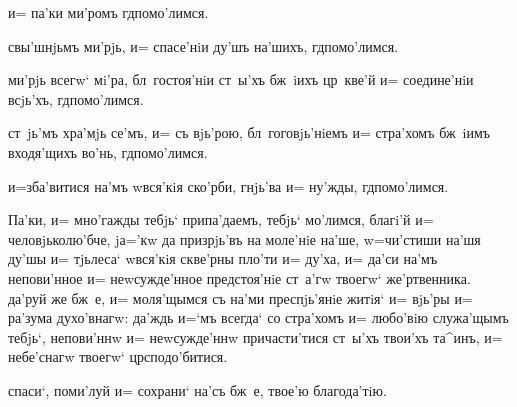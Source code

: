 
  и= па'ки ми'ромъ гд помо'лимся.



 свы'шнjьмъ ми'рjь, и= спасе'нiи ду'шъ на'шихъ, 
гд помо'лимся.


 ми'рjь всегw` мi'ра, бл~гостоя'нiи ст~ы'хъ бж~iихъ 
цр~кве'й и= соедине'нiи всjь'хъ, гд помо'лимся.


 ст~jь'мъ хра'мjь се'мъ, и= съ вjь'рою, 
бл~гоговjь'нiемъ и= стра'хомъ бж~iимъ входя'щихъ во'нь, 
гд помо'лимся.


 и=зба'витися на'мъ w\т вся'кiя ско'рби, гнjь'ва и= 
ну'жды, гд помо'лимся.



Па'ки, и= мно'гажды тебjь` припа'даемъ, тебjь` 
мо'лимся, благi'й и= человjьколю'бче, jа='кw да 
призрjь'въ на моле'нiе на'ше, w=чи'стиши на'шя ду'шы и= 
тjьлеса` w\т вся'кiя скве'рны пло'ти и= ду'ха, и= да'си 
на'мъ непови'нное и= неwсужде'нное предстоя'нiе ст~а'гw 
твоегw` же'ртвенника. да'руй же бж~е, и= моля'щымся съ 
на'ми преспjь'янiе житiя` и= вjь'ры и= ра'зума 
духо'внагw: да'ждь и=`мъ всегда` со стра'хомъ и= любо'вiю 
служа'щымъ тебjь`, непови'ннw и= неwсужде'ннw 
причасти'тися ст~ы'хъ твои'хъ та^инъ, и= небе'снагw 
твоегw` цр сподо'битися.

 спаси`, поми'луй и= сохрани` на'съ бж~е, 
твое'ю благода'тiю.


 



